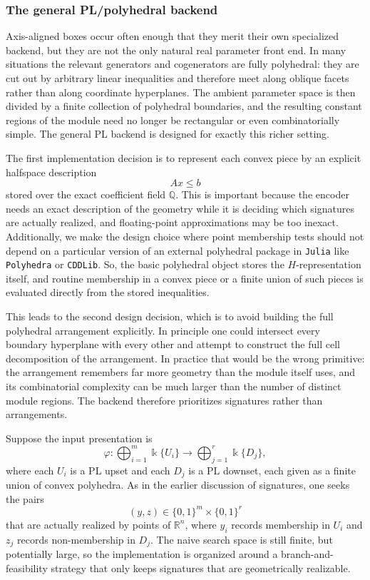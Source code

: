 \documentclass[11pt]{article}
\newcommand{\R}{\mathbb{R}}
\newcommand{\Q}{\mathbb{Q}}
\newcommand{\kk}{\Bbbk}
\theoremstyle{definition}
\theoremstyle{remark}
\begin{document}
\subsubsection*{The general PL/polyhedral backend}

Axis-aligned boxes occur often enough that they merit their own specialized backend, but they are not the only natural real parameter front end.  In many situations the relevant generators and cogenerators are fully polyhedral: they are cut out by arbitrary linear inequalities and therefore meet along oblique facets rather than along coordinate hyperplanes.  The ambient parameter space is then divided by a finite collection of polyhedral boundaries, and the resulting constant regions of the module need no longer be rectangular or even combinatorially simple.  The general PL backend is designed for exactly this richer setting.

The first implementation decision is to represent each convex piece by an explicit halfspace description
\[
A x \leq b
\]
stored over the exact coefficient field \( \Q \).  This is important because the encoder needs an exact description of the geometry while it is deciding which signatures are actually realized, and floating-point approximations may be too inexact. Additionally, we make the design choice where point membership tests should not depend on a particular version of an external polyhedral package in \texttt{Julia} like \texttt{Polyhedra} or \texttt{CDDLib}. So, the basic polyhedral object stores the \(H\)-representation itself, and routine membership in a convex piece or a finite union of such pieces is evaluated directly from the stored inequalities.

This leads to the second design decision, which is to avoid building the full polyhedral arrangement explicitly.  In principle one could intersect every boundary hyperplane with every other and attempt to construct the full cell decomposition of the arrangement.  In practice that would be the wrong primitive: the arrangement remembers far more geometry than the module itself uses, and its combinatorial complexity can be much larger than the number of distinct module regions.  The backend therefore prioritizes signatures rather than arrangements.

Suppose the input presentation is
\[
\varphi \colon \bigoplus_{i=1}^{m} \kk\{U_i\}
\longrightarrow
\bigoplus_{j=1}^{r} \kk\{D_j\},
\]
where each \(U_i\) is a PL upset and each \(D_j\) is a PL downset, each given as a finite union of convex polyhedra.  As in the earlier discussion of signatures, one seeks the pairs
\[
(y,z) \in \{0,1\}^{m} \times \{0,1\}^{r}
\]
that are actually realized by points of \(\R^n\), where \(y_i\) records membership in \(U_i\) and \(z_j\) records non-membership in \(D_j\).  The naive search space is still finite, but potentially large, so the implementation is organized around a branch-and-feasibility strategy that only keeps signatures that are geometrically realizable.
\end{document}
